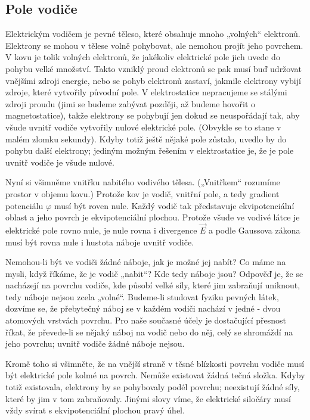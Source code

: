     \subsection{Pole vodiče}
      Elektrickým vodičem je pevné těleso, které obsahuje mnoho „volných“ elektronů. Elektrony se mohou v 
      tělese volně pohybovat, ale nemohou projít jeho povrchem. V kovu je tolik volných elektronů, že 
      jakékoliv elektrické pole jich uvede do pohybu velké množství. Takto vzniklý proud elektronů se pak 
      musí buď udržovat vnějšími zdroji energie, nebo se pohyb elektronů zastaví, jakmile elektrony vybijí 
      zdroje, které vytvořily původní pole. V elektrostatice nepracujeme se stálými zdroji proudu (jimi se 
      budeme zabývat později, až budeme hovořit o magnetostatice), takže elektrony se pohybují jen dokud se 
      neuspořádají tak, aby všude uvnitř vodiče vytvořily nulové elektrické pole. (Obvykle se to stane v 
      malém zlomku sekundy). Kdyby totiž ještě nějaké pole zůstalo, uvedlo by do pohybu další elektrony; 
      jediným možným řešením v elektrostatice je, že je pole uvnitř vodiče je všude nulové.
      
      Nyní si všimněme vnitřku nabitého vodivého tělesa. („Vnitřkem“ rozumíme prostor v objemu kovu.) Protože 
      kov je vodič, vnitřní pole, a tedy gradient potenciálu \(\varphi\) musí být roven nule. Každý vodič tak 
      představuje ekvipotenciální oblast a jeho povrch je ekvipotenciální plochou. Protože všude ve vodivé 
      látce je elektrické pole rovno nule, je nule rovna i divergence \(\vec{E}\) a podle Gaussova zákona 
      musí být rovna nule i hustota náboje uvnitř vodiče.
      
      Nemohou-li být ve vodiči žádné náboje, jak je možné jej nabít? Co máme na mysli, když říkáme, že je 
      vodič „nabit“? Kde tedy náboje jsou? Odpověď je, že se nacházejí na povrchu vodiče, kde působí velké 
      síly, které jim zabraňují uniknout, tedy náboje nejsou zcela „volné“. Budeme-li studovat fyziku pevných 
      látek, dozvíme se, že přebytečný náboj se v každém vodiči nachází v jedné - dvou atomových vrstvách 
      povrchu. Pro naše současné účely je dostačující přesnost říkat, že převede-li se nějaký náboj na vodič 
      nebo do něj, celý se shromáždí na jeho povrchu; uvnitř vodiče žádné náboje nejsou.
      
      Kromě toho si všimněte, že na vnější straně v těsné blízkosti povrchu vodiče musí být elektrické pole 
      kolmé na povrch. Nemůže existovat žádná tečná složka. Kdyby totiž existovala, elektrony by se 
      pohybovaly podél povrchu; neexistují žádné síly, které by jim v tom zabraňovaly. Jinými slovy víme, že 
      elektrické siločáry musí vždy svírat s ekvipotenciální plochou pravý úhel.
      
